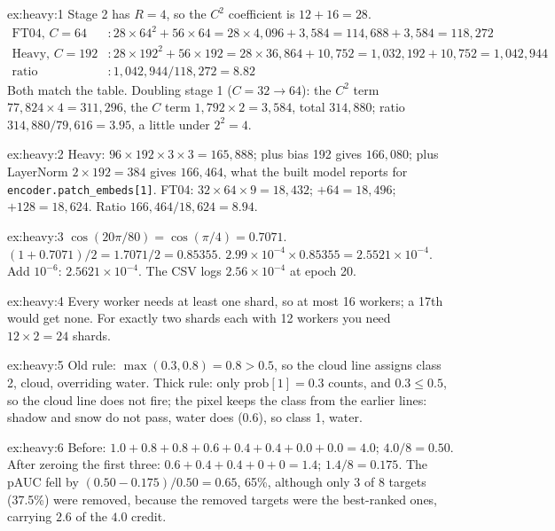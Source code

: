 
\begin{solution}{ex:heavy:1}
Stage 2 has $R=4$, so the $C^2$ coefficient is $12+16=28$.
\begin{align*}
\text{FT04, } C=64 &: 28\times64^2+56\times64 = 28\times4{,}096+3{,}584 = 114{,}688+3{,}584 = 118{,}272\\
\text{Heavy, } C=192 &: 28\times192^2+56\times192 = 28\times36{,}864+10{,}752 = 1{,}032{,}192+10{,}752 = 1{,}042{,}944\\
\text{ratio} &: 1{,}042{,}944/118{,}272 = 8.82
\end{align*}
Both match the table. Doubling stage 1 ($C=32\to64$): the $C^2$ term $77{,}824\times4=311{,}296$, the $C$ term
$1{,}792\times2=3{,}584$, total $314{,}880$; ratio $314{,}880/79{,}616=3.95$, a little under $2^2=4$.
\end{solution}

\begin{solution}{ex:heavy:2}
Heavy: $96\times192\times3\times3=165{,}888$; plus bias 192 gives $166{,}080$; plus LayerNorm $2\times192=384$ gives
$166{,}464$, what the built model reports for \texttt{encoder.patch\_embeds[1]}. FT04: $32\times64\times9=18{,}432$;
$+64=18{,}496$; $+128=18{,}624$. Ratio $166{,}464/18{,}624=8.94$.
\end{solution}

\begin{solution}{ex:heavy:3}
$\cos(20\pi/80)=\cos(\pi/4)=0.7071$. $(1+0.7071)/2=1.7071/2=0.85355$. $2.99\times10^{-4}\times0.85355=2.5521\times10^{-4}$.
Add $10^{-6}$: $2.5621\times10^{-4}$. The CSV logs $2.56\times10^{-4}$ at epoch 20.
\end{solution}

\begin{solution}{ex:heavy:4}
Every worker needs at least one shard, so at most 16 workers; a 17th would get none. For exactly two shards each
with 12 workers you need $12\times2=24$ shards.
\end{solution}

\begin{solution}{ex:heavy:5}
Old rule: $\max(0.3,0.8)=0.8>0.5$, so the cloud line assigns class 2, cloud, overriding water. Thick rule: only
$\text{prob}[1]=0.3$ counts, and $0.3\le0.5$, so the cloud line does not fire; the pixel keeps the class from the
earlier lines: shadow and snow do not pass, water does (0.6), so class 1, water.
\end{solution}

\begin{solution}{ex:heavy:6}
Before: $1.0+0.8+0.8+0.6+0.4+0.4+0.0+0.0=4.0$; $4.0/8=0.50$. After zeroing the first three:
$0.6+0.4+0.4+0+0=1.4$; $1.4/8=0.175$. The pAUC fell by $(0.50-0.175)/0.50=0.65$, 65\%, although only 3 of 8 targets
(37.5\%) were removed, because the removed targets were the best-ranked ones, carrying $2.6$ of the $4.0$ credit.
\end{solution}


